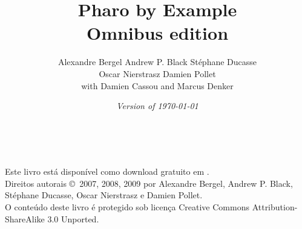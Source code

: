 \documentclass[a4paper,10pt,twoside]{book}
\begin{document}
\frontmatter
\setcounter{page}{1}
\pagestyle{headings}
\author{
	 Alexandre Bergel\quad
	Andrew P. Black\quad
	St\'ephane Ducasse\\[1ex]
	Oscar Nierstrasz\quad
	Damien Pollet
	\\[4ex]
	with Damien Cassou and Marcus Denker}
\title{\Huge\bf Pharo by Example\\ Omnibus edition}
\isodate
\date{\emph{Version of \today}}
\maketitle
~ %
\vfill
\begin{footnotesize}
\setlength{\parindent}{0pt}
Este livro está disponível como download gratuito em \pbe.\\[1cm]

Direitos autorais \copyright~2007, 2008, 2009 por Alexandre Bergel, Andrew P. Black, St\'ephane Ducasse, Oscar Nierstrasz e Damien Pollet.\\[1cm]

O conteúdo deste livro é protegido sob licença Creative Commons Attribution-ShareAlike 3.0 Unported.


\end{footnotesize}
\end{document}
